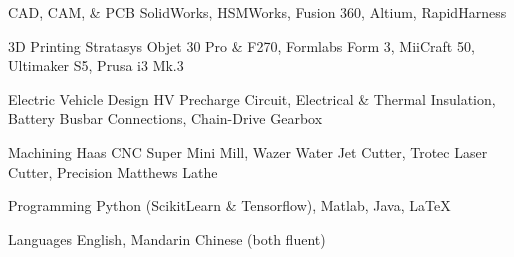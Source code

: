 


\begin{cvskills}


\cvskill
{CAD, CAM, \& PCB} %
{SolidWorks, HSMWorks, Fusion 360, Altium, RapidHarness} %


\cvskill
{3D Printing} %
{Stratasys Objet 30 Pro \& F270, Formlabs Form 3, MiiCraft 50, Ultimaker S5, Prusa i3 Mk.3} %

\cvskill
{Electric Vehicle Design}
{HV Precharge Circuit, Electrical \& Thermal Insulation, Battery Busbar Connections, Chain-Drive Gearbox}


\cvskill
{Machining}
{Haas CNC Super Mini Mill, Wazer Water Jet Cutter, Trotec Laser Cutter, Precision Matthews Lathe}



\cvskill
{Programming} %
{Python (ScikitLearn \& Tensorflow), Matlab, Java, LaTeX} %

\cvskill
{Languages}
{English, Mandarin Chinese (both fluent)}


\end{cvskills}